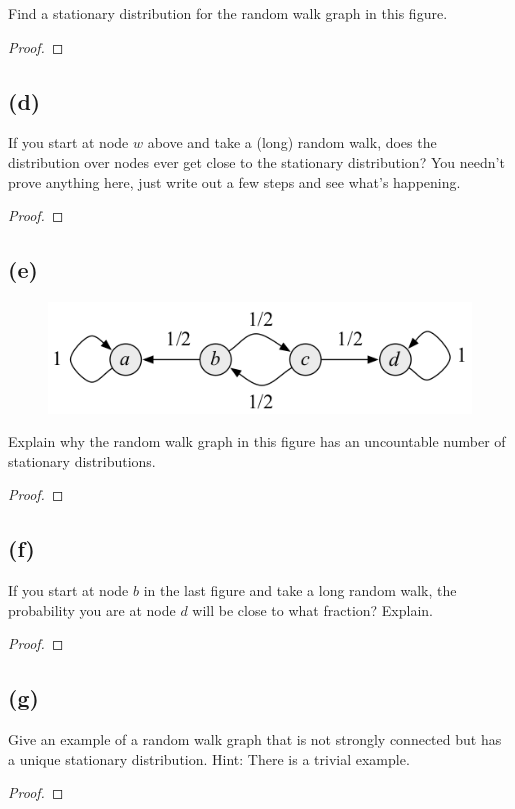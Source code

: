 \documentclass[14pt]{extarticle}
\begin{document}
Find a stationary distribution for the random walk graph in this figure.
\begin{proof}
\end{proof}

\subsection{(d)}
If you start at node $w$ above and take a (long) random walk, does the distribution over nodes ever get close to the stationary distribution? You needn’t prove anything here, just write out a few steps and see what’s happening.
\begin{proof}
\end{proof}

\subsection{(e)}
\begin{figure}[ht!]
\centering
\includegraphics[scale=0.6]{random-walk-3.png}
\end{figure}
Explain why the random walk graph in this figure has an uncountable number of stationary distributions.
\begin{proof}
\end{proof}

\subsection{(f)}
If you start at node $b$ in the last figure and take a long random walk, the probability you are at node $d$ will be close to what fraction? Explain.
\begin{proof}
\end{proof}

\subsection{(g)}
Give an example of a random walk graph that is not strongly connected but has a unique stationary distribution. Hint: There is a trivial example.
\begin{proof}
\end{proof}
\end{document}
